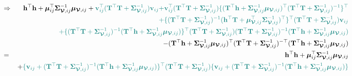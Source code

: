 \documentclass[12pt]{article}
\newcommand{\0}{\mathbf{0}}
\begin{document}
\begin{eqnarray*}
& \Rightarrow & \mathbf{h}^{\top} \mathbf{h} + \boldsymbol{\mu}_{ij}^{\top} \boldsymbol{\Sigma}_{\boldsymbol{\mathcal{V}}, ij}^{-1} \boldsymbol{\mu}_{\boldsymbol{\mathcal{V}}, ij} + \textcolor{kaustgreen}{ \mathbf{v}_{ij}^{\top} ( \mathbf{T}^{\top} \mathbf{T} + \boldsymbol{\Sigma}_{\boldsymbol{\mathcal{V}}, ij}^{-1} ) \mathbf{v}_{ij}} \textcolor{kaustgreen}{+ \mathbf{v}_{ij}^{\top} ( \mathbf{T}^{\top} \mathbf{T} + \boldsymbol{\Sigma}_{\boldsymbol{\mathcal{V}}, ij}^{-1} ) \{ ( \mathbf{T}^{\top} \mathbf{h} + \boldsymbol{\Sigma}_{\boldsymbol{\mathcal{V}}, ij}^{-1}\boldsymbol{\mu}_{\boldsymbol{\mathcal{V}}, ij} )^{\top} ( \mathbf{T}^{\top} \mathbf{T} + \boldsymbol{\Sigma}_{\boldsymbol{\mathcal{V}}, ij}^{-1} )^{-1} \}^{\top} } \\
&&  \textcolor{kaustgreen}{+ \{ ( \mathbf{T}^{\top} \mathbf{T} + \boldsymbol{\Sigma}_{\boldsymbol{\mathcal{V}}, ij}^{-1} )^{-1} ( \mathbf{h}^{\top} \mathbf{T} + \boldsymbol{\mu}_{\boldsymbol{\mathcal{V}}, ij}^{\top} \boldsymbol{\Sigma}_{\boldsymbol{\mathcal{V}}, ij}^{-1})^{\top} \}^{\top} ( \mathbf{T}^{\top} \mathbf{T} + \boldsymbol{\Sigma}_{\boldsymbol{\mathcal{V}}, ij}^{-1} ) \mathbf{v}_{ij} } \\
&&  \textcolor{kaustgreen}{ + \{ ( \mathbf{T}^{\top} \mathbf{T} + \boldsymbol{\Sigma}_{\boldsymbol{\mathcal{V}}, ij}^{-1} )^{-1}  ( \mathbf{T}^{\top} \mathbf{h} + \boldsymbol{\Sigma}_{\boldsymbol{\mathcal{V}}, ij}^{-1}\boldsymbol{\mu}_{\boldsymbol{\mathcal{V}}, ij} ) \}^{\top} } \textcolor{kaustgreen}{ ( \mathbf{T}^{\top} \mathbf{T} + \boldsymbol{\Sigma}_{\boldsymbol{\mathcal{V}}, ij}^{-1} ) ( \mathbf{T}^{\top} \mathbf{T} + \boldsymbol{\Sigma}_{\boldsymbol{\mathcal{V}}, ij}^{-1} )^{-1} ( \mathbf{T}^{\top} \mathbf{h} + \boldsymbol{\Sigma}_{\boldsymbol{\mathcal{V}}, ij}^{-1}\boldsymbol{\mu}_{\boldsymbol{\mathcal{V}}, ij} ) } \\
&&- ( \mathbf{T}^{\top} \mathbf{h} + \boldsymbol{\Sigma}_{\boldsymbol{\mathcal{V}}, ij}^{-1}\boldsymbol{\mu}_{\boldsymbol{\mathcal{V}}, ij} )^{\top}  ( \mathbf{T}^{\top} \mathbf{T} + \boldsymbol{\Sigma}_{\boldsymbol{\mathcal{V}}, ij}^{-1} )^{-\top}  ( \mathbf{T}^{\top} \mathbf{h} + \boldsymbol{\Sigma}_{\boldsymbol{\mathcal{V}}, ij}^{-1}\boldsymbol{\mu}_{\boldsymbol{\mathcal{V}}, ij} ) \\
& = & \mathbf{h}^{\top} \mathbf{h} + \boldsymbol{\mu}_{ij}^{\top} \boldsymbol{\Sigma}_{\boldsymbol{\mathcal{V}}, ij}^{-1} \boldsymbol{\mu}_{\boldsymbol{\mathcal{V}}, ij} \\
&& + \textcolor{kaustgreen}{ \{ \mathbf{v}_{ij} + ( \mathbf{T}^{\top} \mathbf{T} + \boldsymbol{\Sigma}_{\boldsymbol{\mathcal{V}}, ij}^{-1} )^{-1}  ( \mathbf{T}^{\top} \mathbf{h} + \boldsymbol{\Sigma}_{\boldsymbol{\mathcal{V}}, ij}^{-1}\boldsymbol{\mu}_{\boldsymbol{\mathcal{V}}, ij} )  \}^{\top} ( \mathbf{T}^{\top} \mathbf{T} + \boldsymbol{\Sigma}_{\boldsymbol{\mathcal{V}}, ij}^{-1} )  }\textcolor{kaustgreen}{ \{ \mathbf{v}_{ij} + ( \mathbf{T}^{\top} \mathbf{T} + \boldsymbol{\Sigma}_{\boldsymbol{\mathcal{V}}, ij}^{-1} )^{-1}  ( \mathbf{T}^{\top} \mathbf{h} + \boldsymbol{\Sigma}_{\boldsymbol{\mathcal{V}}, ij}^{-1}\boldsymbol{\mu}_{\boldsymbol{\mathcal{V}}, ij} ) \} } \\

\end{eqnarray*}
\end{document}
